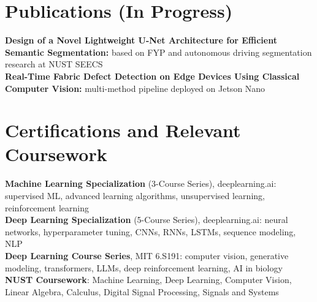 \documentclass[letterpaper,11pt]{article}
\begin{document}
\section{Publications (In Progress)}
 \begin{itemize}[leftmargin=0.15in, label={}]
    \small{\item{
     \textbf{Design of a Novel Lightweight U-Net Architecture for Efficient Semantic Segmentation:} based on FYP and autonomous driving segmentation research at NUST SEECS \\
     \textbf{Real-Time Fabric Defect Detection on Edge Devices Using Classical Computer Vision:} multi-method pipeline deployed on Jetson Nano
    }}
 \end{itemize}

\section{Certifications and Relevant Coursework}
 \begin{itemize}[leftmargin=0.15in, label={}]
    \small{\item{
     \textbf{Machine Learning Specialization} (3-Course Series), deeplearning.ai: supervised ML, advanced learning algorithms, unsupervised learning, reinforcement learning \\
     \textbf{Deep Learning Specialization} (5-Course Series), deeplearning.ai: neural networks, hyperparameter tuning, CNNs, RNNs, LSTMs, sequence modeling, NLP \\
     \textbf{Deep Learning Course Series}, MIT 6.S191: computer vision, generative modeling, transformers, LLMs, deep reinforcement learning, AI in biology \\
     \textbf{NUST Coursework}: Machine Learning, Deep Learning, Computer Vision, Linear Algebra, Calculus, Digital Signal Processing, Signals and Systems
    }}
 \end{itemize}

\end{document}
